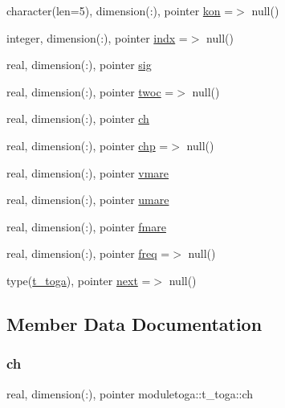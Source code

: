 \begin{DoxyCompactItemize}
\item 
character(len=5), dimension(\+:), pointer \mbox{\hyperlink{structmoduletoga_1_1t__toga_a22f180cb91f3aa3adcfe3e6552606e87}{kon}} =$>$ null()
\item 
integer, dimension(\+:), pointer \mbox{\hyperlink{structmoduletoga_1_1t__toga_a4f8c50a80e54d4c02b035b9d695ee15d}{indx}} =$>$ null()
\item 
real, dimension(\+:), pointer \mbox{\hyperlink{structmoduletoga_1_1t__toga_afc16fa49bbe71fd6ddcbaf97ee83244d}{sig}}
\item 
real, dimension(\+:), pointer \mbox{\hyperlink{structmoduletoga_1_1t__toga_a44a4c64851d48a0bdcc7af867d276db2}{twoc}} =$>$ null()
\item 
real, dimension(\+:), pointer \mbox{\hyperlink{structmoduletoga_1_1t__toga_a9a8f58b2188a6be437b832e244a84ad7}{ch}}
\item 
real, dimension(\+:), pointer \mbox{\hyperlink{structmoduletoga_1_1t__toga_a042f3d3231421173d95b1758d00e70bd}{chp}} =$>$ null()
\item 
real, dimension(\+:), pointer \mbox{\hyperlink{structmoduletoga_1_1t__toga_ad587684e16b415cb69923ac181859293}{vmare}}
\item 
real, dimension(\+:), pointer \mbox{\hyperlink{structmoduletoga_1_1t__toga_a3034a96fa7f955cd1c6e3a092581c052}{umare}}
\item 
real, dimension(\+:), pointer \mbox{\hyperlink{structmoduletoga_1_1t__toga_af26bcd0f57656e15a274ed5be170c0b3}{fmare}}
\item 
real, dimension(\+:), pointer \mbox{\hyperlink{structmoduletoga_1_1t__toga_a8408a07d20352b3c73e448b30e4d6494}{freq}} =$>$ null()
\item 
type(\mbox{\hyperlink{structmoduletoga_1_1t__toga}{t\+\_\+toga}}), pointer \mbox{\hyperlink{structmoduletoga_1_1t__toga_a836bd43b3c7c10cd324d8dbaa642c04d}{next}} =$>$ null()
\end{DoxyCompactItemize}


\subsection{Member Data Documentation}
\mbox{\label{structmoduletoga_1_1t__toga_a9a8f58b2188a6be437b832e244a84ad7}} 
\subsubsection{\texorpdfstring{ch}{ch}}
{\footnotesize\ttfamily real, dimension(\+:), pointer moduletoga\+::t\+\_\+toga\+::ch\hspace{0.3cm}{\ttfamily [private]}}

